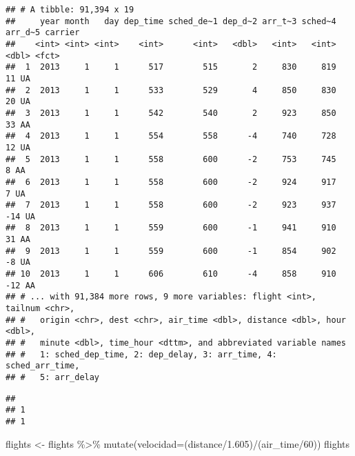 \documentclass[
]{article}
\newenvironment{Shaded}{\begin{snugshade}}{\end{snugshade}}
\newcommand{\AttributeTok}[1]{\textcolor[rgb]{0.77,0.63,0.00}{#1}}
\newcommand{\DecValTok}[1]{\textcolor[rgb]{0.00,0.00,0.81}{#1}}
\newcommand{\FloatTok}[1]{\textcolor[rgb]{0.00,0.00,0.81}{#1}}
\newcommand{\FunctionTok}[1]{\textcolor[rgb]{0.00,0.00,0.00}{#1}}
\newcommand{\NormalTok}[1]{#1}
\newcommand{\OtherTok}[1]{\textcolor[rgb]{0.56,0.35,0.01}{#1}}
\newcommand{\SpecialCharTok}[1]{\textcolor[rgb]{0.00,0.00,0.00}{#1}}
\begin{document}
\begin{verbatim}
## # A tibble: 91,394 x 19
##     year month   day dep_time sched_de~1 dep_d~2 arr_t~3 sched~4 arr_d~5 carrier
##    <int> <int> <int>    <int>      <int>   <dbl>   <int>   <int>   <dbl> <fct>  
##  1  2013     1     1      517        515       2     830     819      11 UA     
##  2  2013     1     1      533        529       4     850     830      20 UA     
##  3  2013     1     1      542        540       2     923     850      33 AA     
##  4  2013     1     1      554        558      -4     740     728      12 UA     
##  5  2013     1     1      558        600      -2     753     745       8 AA     
##  6  2013     1     1      558        600      -2     924     917       7 UA     
##  7  2013     1     1      558        600      -2     923     937     -14 UA     
##  8  2013     1     1      559        600      -1     941     910      31 AA     
##  9  2013     1     1      559        600      -1     854     902      -8 UA     
## 10  2013     1     1      606        610      -4     858     910     -12 AA     
## # ... with 91,384 more rows, 9 more variables: flight <int>, tailnum <chr>,
## #   origin <chr>, dest <chr>, air_time <dbl>, distance <dbl>, hour <dbl>,
## #   minute <dbl>, time_hour <dttm>, and abbreviated variable names
## #   1: sched_dep_time, 2: dep_delay, 3: arr_time, 4: sched_arr_time,
## #   5: arr_delay
\end{verbatim}

\begin{Shaded}
\end{Shaded}

\begin{verbatim}
## 
## 1 
## 1
\end{verbatim}

\begin{Shaded}
\begin{Highlighting}[]
\NormalTok{  flights }\OtherTok{\textless{}{-}}\NormalTok{ flights }\SpecialCharTok{\%\textgreater{}\%}
                  \FunctionTok{mutate}\NormalTok{(}\AttributeTok{velocidad=}\NormalTok{(distance}\SpecialCharTok{/}\FloatTok{1.605}\NormalTok{)}\SpecialCharTok{/}\NormalTok{(air\_time}\SpecialCharTok{/}\DecValTok{60}\NormalTok{))}
\NormalTok{  flights}
\end{Highlighting}
\end{Shaded}
\end{document}
